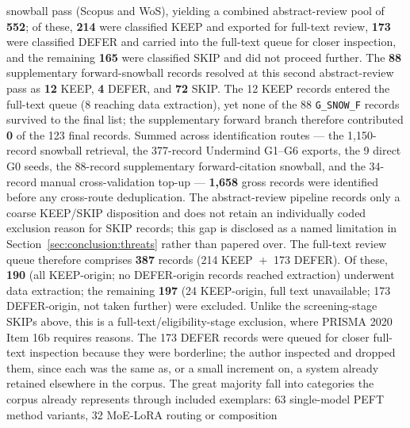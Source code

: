 snowball pass (Scopus and WoS), yielding a combined abstract-review pool of
\textbf{552}; of these, \textbf{214} were classified KEEP and exported for
full-text review, \textbf{173} were classified DEFER and carried into the
full-text queue for closer inspection, and the remaining \textbf{165} were
classified SKIP and did not proceed further. The \textbf{88} supplementary forward-snowball records
resolved at this second abstract-review pass as \textbf{12} KEEP, \textbf{4}
DEFER, and \textbf{72} SKIP. The 12 KEEP records entered the full-text queue
(8 reaching data extraction), yet none of the 88 \texttt{G\_SNOW\_F} records
survived to the final list; the supplementary forward branch therefore
contributed \textbf{0} of the 123 final records. Summed across identification
routes --- the 1,150-record snowball retrieval, the 377-record Undermind
G1--G6 exports, the 9 direct G0 seeds, the 88-record supplementary
forward-citation snowball, and the 34-record manual cross-validation top-up
--- \textbf{1,658} gross records were identified before any cross-route
deduplication. %
The abstract-review pipeline records only a coarse KEEP/SKIP disposition and
does not retain an individually coded exclusion reason for SKIP records; this
gap is disclosed as a named limitation in
Section~\ref{sec:conclusion:threats} rather than papered over. The full-text
review queue therefore comprises \textbf{387} records (214 KEEP
${}+{}$ 173 DEFER). Of these, \textbf{190} (all KEEP-origin; no DEFER-origin
records reached extraction) underwent data extraction; the remaining
\textbf{197} (24 KEEP-origin, full text unavailable; 173 DEFER-origin, not
taken further) were excluded. Unlike the screening-stage SKIPs above, this
is a full-text/eligibility-stage exclusion, where PRISMA 2020 Item 16b
requires reasons. The 173 DEFER records were queued for closer full-text
inspection because they were borderline; the author inspected and dropped
them, since each was the same as, or a small increment on, a system
already retained elsewhere in the corpus. The great majority fall into
categories the corpus already represents through included exemplars:
63 single-model PEFT method variants, 32 MoE-LoRA routing or composition

